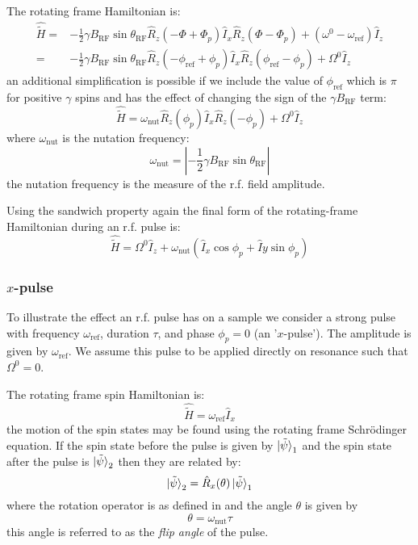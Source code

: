 The rotating frame Hamiltonian is:
\begin{align}
  \hat{\tilde{H}} =& -\frac{1}{2}\gamma{B_{\text{RF}}}\sin{\theta_{\text{RF}}}\hat{R}_z(-\Phi  +  \Phi_p)\hat{I}_x\hat{R}_z(\Phi-\Phi_p) + (\omega^0 - \omega_\text{ref})\hat{I}_z \\
  =& -\frac{1}{2}\gamma{B_{\text{RF}}}\sin{\theta_{\text{RF}}}\hat{R}_z(-\phi_{\text{ref}}  +  \phi_p)\hat{I}_x\hat{R}_z(\phi_{\text{ref}}-\phi_p) + \Omega^0\hat{I}_z
\end{align}
an additional simplification is possible if we include the value of $\phi_{\text{ref}}$ which is
$\pi$ for positive $\gamma$ spins and has the effect of changing the sign of the $\gamma{B_{\text{RF}}}$
term:
\begin{equation}
  \hat{\tilde{H}} = \omega_{\text{nut}}\hat{R}_z(\phi_p)\hat{I}_x\hat{R}_z(-\phi_p) + \Omega^0\hat{I}_z
\end{equation}
where $\omega_{\text{nut}}$ is the nutation frequency:
\begin{equation}
  \omega_{\text{nut}} = |-\frac{1}{2}\gamma{B_{\text{RF}}}\sin{\theta_{\text{RF}}}|
\end{equation}
the nutation frequency is the measure of the r.f. field amplitude.

Using the sandwich property again the final form of the rotating-frame Hamiltonian during an r.f. pulse
is:
\begin{equation}
  \hat{\tilde{H}} = \Omega^0\hat{I}_z + \omega_{\text{nut}}(\hat{I}_x\cos\phi_p + \hat{I}y\sin\phi_p)
\end{equation}


\subsubsection{$x$-pulse}

To illustrate the effect an r.f. pulse has on a sample we consider a strong
pulse with frequency $\omega_\text{ref}$, duration $\tau$, and phase $\phi_p = 0$ (an '$x$-pulse').
The amplitude is given by $\omega_\text{ref}$. We assume this pulse to be applied
directly on resonance such that $\Omega^0 = 0$.

The rotating frame spin Hamiltonian is:
\begin{equation}
  \hat{\tilde{H}} = \omega_{\text{ref}}\hat{I}_x
\end{equation}
the motion of the spin states may be found using the rotating frame Schr\"odinger equation. If the
spin state before the pulse is given by $\ket{\tilde{\psi}}_1$ and the spin state after the pulse
is $\ket{\tilde{\psi}}_2$ then they are related by:
\begin{equation}
  \ket{\tilde{\psi}}_2 = \hat{R}_x(\theta)\ket{\tilde{\psi}}_1
\end{equation}
where the rotation operator is as defined in  and the angle
$\theta$ is given by
\begin{equation}
  \theta = \omega_\text{nut}\tau
\end{equation}
this angle is referred to as the \textit{flip angle} of the pulse.


